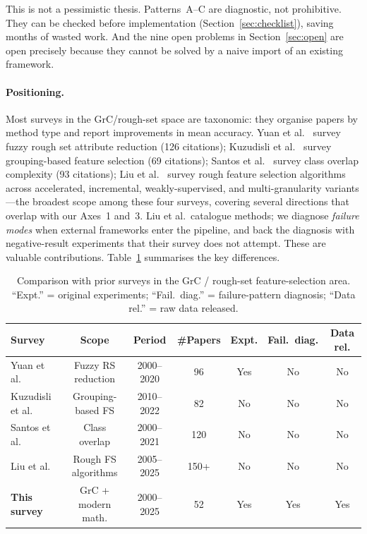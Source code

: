 This is not a pessimistic thesis.  Patterns~A--C are diagnostic, not
prohibitive.  They can be checked before implementation
(Section~\ref{sec:checklist}), saving months of wasted work.  And the
nine open problems in Section~\ref{sec:open} are open precisely
because they cannot be solved by a naive import of an existing framework.

\paragraph{Positioning.}
Most surveys in the GrC/rough-set space are taxonomic: they organise
papers by method type and report improvements in mean accuracy.
Yuan et al.~\cite{Yuan2021survey} survey fuzzy rough set attribute reduction
(126 citations); Kuzudisli et al.~\cite{Kuzudisli2023review} survey
grouping-based feature selection (69 citations); Santos et
al.~\cite{Santos2022overlap} survey class overlap complexity (93 citations);
Liu et al.~\cite{Liu2026survey} survey rough feature
selection algorithms across accelerated, incremental, weakly-supervised, and
multi-granularity variants---the broadest scope among these four surveys,
covering several directions that overlap with our Axes~1 and~3.
Liu et al.\ catalogue methods; we diagnose \emph{failure modes} when
external frameworks enter the pipeline, and back the diagnosis with
negative-result experiments that their survey does not attempt.
These are valuable contributions.
Table~\ref{tab:survey_compare} summarises the key differences.

\begin{table}[pos=!htbp]
\caption{Comparison with prior surveys in the GrC / rough-set feature-selection
area.  ``Expt.'' = original experiments; ``Fail.\ diag.'' = failure-pattern
diagnosis; ``Data rel.'' = raw data released.}
\label{tab:survey_compare}
\centering\small
\setlength\tabcolsep{3pt}
\begin{tabular}{p{3.2cm}cccccc}
\toprule
Survey & Scope & Period & \#Papers & Expt. & Fail.\ diag. & Data rel. \\
\midrule
Yuan et al.~\cite{Yuan2021survey}
  & Fuzzy RS reduction & 2000--2020 & 96 & Yes & No & No \\
Kuzudisli et al.~\cite{Kuzudisli2023review}
  & Grouping-based FS & 2010--2022 & 82 & No & No & No \\
Santos et al.~\cite{Santos2022overlap}
  & Class overlap & 2000--2021 & 120 & No & No & No \\
Liu et al.~\cite{Liu2026survey}
  & Rough FS algorithms & 2005--2025 & 150+ & No & No & No \\
\textbf{This survey}
  & GrC + modern math. & 2000--2025 & 52 & Yes & Yes & Yes \\
\bottomrule
\end{tabular}
\end{table}


